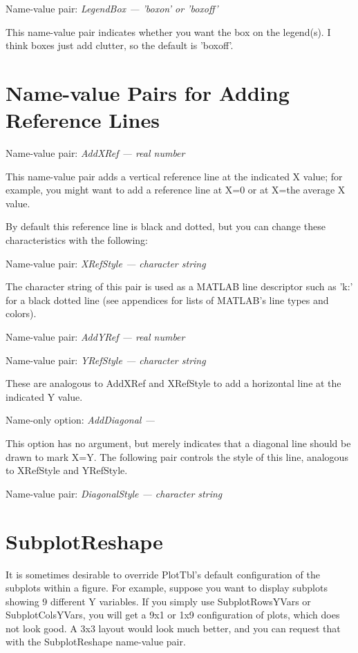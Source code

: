 \documentclass{article}
\newcommand{\namevalue}[2]{{\it #1 --- #2}}
\begin{document}
Name-value pair: \namevalue{LegendBox}{'boxon' or 'boxoff'}

This name-value pair indicates whether you want the box on the legend(s).
I think boxes just add clutter, so the default is 'boxoff'.

\section{Name-value Pairs for Adding Reference Lines}  %

Name-value pair: \namevalue{AddXRef}{real number}

This name-value pair adds a vertical reference line at the indicated X value;
for example, you might want to add a reference line at X=0 or at X=the average X value.

By default this reference line is black and dotted, but you can change these characteristics
with the following:

Name-value pair: \namevalue{XRefStyle}{character string}

The character string of this pair is used as a MATLAB line descriptor such as 'k:' for a
black dotted line (see appendices for lists of MATLAB's line types and colors).

Name-value pair: \namevalue{AddYRef}{real number}

Name-value pair: \namevalue{YRefStyle}{character string}

These are analogous to AddXRef and XRefStyle to add a horizontal line at the indicated Y value.

Name-only option: \namevalue{AddDiagonal}{ }

This option has no argument, but merely indicates that a diagonal line should be drawn to mark X=Y.
The following pair controls the style of this line, analogous to XRefStyle and YRefStyle.

Name-value pair: \namevalue{DiagonalStyle}{character string}

\section{SubplotReshape}

It is sometimes desirable to override PlotTbl's default configuration of
the subplots within a figure.
For example, suppose you want to display subplots showing 9 different Y variables.
If you simply use SubplotRowsYVars or SubplotColsYVars, you will get a 9x1
or 1x9 configuration of plots, which does not look good.
A 3x3 layout would look much better, and you can request that with
the SubplotReshape name-value pair.
\end{document}

